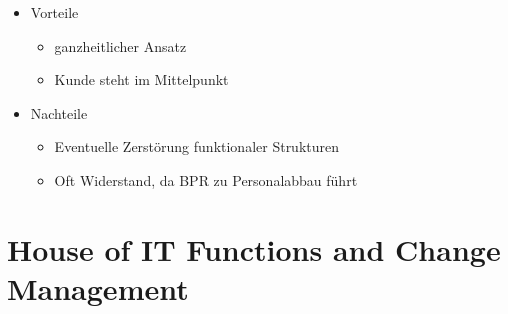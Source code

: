 \documentclass[11pt,a4paper]{article}
\begin{document}
\begin{itemize}
\item Vorteile
	\begin{itemize}
	\item ganzheitlicher Ansatz
	\item Kunde steht im Mittelpunkt
	\end{itemize}
	
\item Nachteile
	\begin{itemize}
	\item Eventuelle Zerstörung funktionaler Strukturen
	\item Oft Widerstand, da BPR zu Personalabbau führt
	\end{itemize}

\end{itemize}

\section{House of IT Functions and Change Management}
\end{document}
